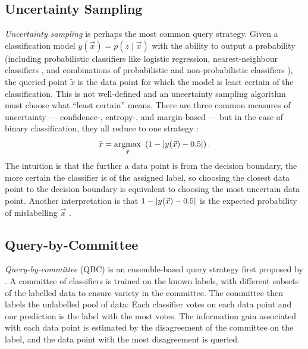     \subsection{Uncertainty Sampling}
    \label{sec:uncertainty-sampling}

        \emph{Uncertainty sampling} \citep{lewis94} is perhaps the most common
        query strategy. Given a classification model $y(\vec x) = p(z \mid
        \vec{x})$ with the ability to output a probability (including
        probabilistic classifiers like logistic regression, nearest-neighbour
        classifiers \citep{lewis94}, and combinations of probabilistic and
        non-probabilistic classifiers \citep{lewis94b}), the queried point
        $\tilde x$ is the data point for which the model is least certain of the
        classification. This is not well-defined and an uncertainty sampling
        algorithm must choose what ``least certain'' means. There are three
        common measures of uncertainty --- confidence-, entropy-, and
        margin-based --- but in the case of binary classification, they all
        reduce to one strategy
        \citep{settles09}:
        \[
            \tilde x = \underset{\vec x}{\mbox{argmax}}\ \left(1 - \abs{y(\vec x) - 0.5}\right).
        \]
        The intuition is that the further a data point is from the decision
        boundary, the more certain the classifier is of the assigned label, so
        choosing the closest data point to the decision boundary is equivalent
        to choosing the most uncertain data point. Another interpretation is
        that $1 - |y(\vec x) - 0.5|$ is the expected probability of
        mislabelling $\vec x$ \citep{settles09}.



    \subsection{Query-by-Committee}
    \label{sec:qbc}

        \emph{Query-by-committee} (QBC) is an ensemble-based query strategy
        first proposed by \citet{seung92}. A committee of classifiers is trained
        on the known labels, with different subsets of the labelled data to
        ensure variety in the committee. The committee then labels the
        unlabelled pool of data: Each classifier votes on each data point and
        our prediction is the label with the most votes. The information gain
        associated with each data point is estimated by the disagreement of the
        committee on the label, and the data point with the most disagreement is
        queried.

